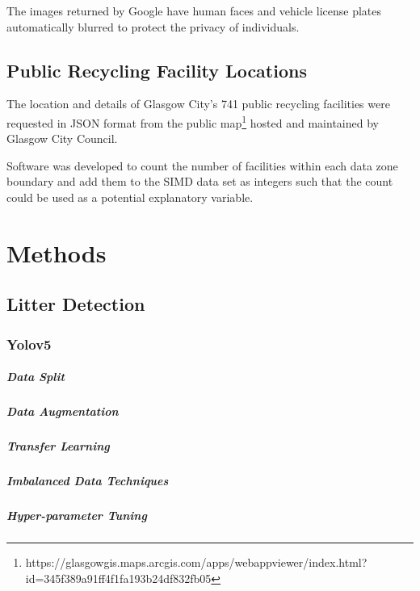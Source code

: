 \documentclass{thesis}
\begin{document}
The images returned by Google have human faces and vehicle license plates automatically blurred to protect the privacy of individuals.

\section{Public Recycling Facility Locations}

The location and details of Glasgow City's 741 public recycling facilities were requested in JSON format from the public map\footnote{https://glasgowgis.maps.arcgis.com/apps/webappviewer/index.html?id=345f389a91ff4f1fa193b24df832fb05} hosted and maintained by Glasgow City Council.

Software was developed to count the number of facilities within each data zone boundary and add them to the SIMD data set as integers such that the count could be used as a potential explanatory variable.


\chapter{Methods} \label{chapter:methods}
\todo{}

\section{Litter Detection}
\subsection{Yolov5}
\paragraph{Data Split}
\paragraph{Data Augmentation}
\paragraph{Transfer Learning}
\paragraph{Imbalanced Data Techniques}
\paragraph{Hyper-parameter Tuning}
\end{document}
